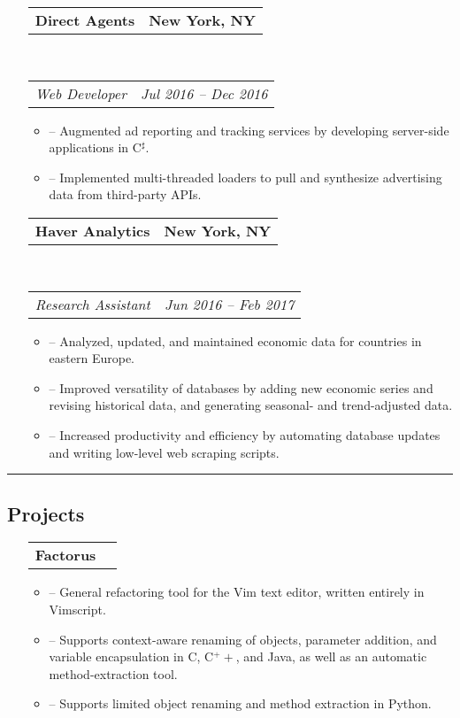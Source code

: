 \documentclass[10.5pt,letterpaper]{article}
\makeatletter
\newenvironment{shortlist}
{\setlength{\linewidth}{0.9\linewidth}
\begin{itemize}
}
{\end{itemize}}
\newcommand{\headerrow}[2]
{\begin{tabular*}{\linewidth}{l@{\extracolsep{\fill}}r}
	#1 &
	#2 \\
\end{tabular*}}
\makeatother
\begin{document}
\begin{itemize}
    \item[]
	\headerrow
		{\textbf{Direct Agents}}
		{\textbf{New York, NY}}
	\\
	\headerrow
		{\emph{Web Developer}}
		{\emph{Jul 2016 -- Dec 2016}}
	\begin{shortlist}
        \item[--]
        Augmented ad reporting and tracking services by developing server-side
        applications in C$^\sharp$.

        \item[--]
        Implemented multi-threaded loaders to pull and synthesize advertising data from third-party
        APIs.

	\end{shortlist}

    \item[]
	\headerrow
		{\textbf{Haver Analytics}}
		{\textbf{New York, NY}}
	\\
	\headerrow
		{\emph{Research Assistant}}
		{\emph{Jun 2016 -- Feb 2017}}
	\begin{shortlist}
        \item[--]
        Analyzed, updated, and maintained economic data for countries in eastern Europe.
        \item[--]
        Improved versatility of databases by adding new economic series and revising historical data, and
        generating seasonal- and trend-adjusted data.
        \item[--]
        Increased productivity and efficiency by automating database 
        updates and writing low-level web scraping scripts.
	\end{shortlist}

\end{itemize}

\hrule
\vspace{-0.4em}

\subsection*{Projects}

\begin{itemize}
    \parskip=0.1em

    \item[]
	\headerrow
		{\textbf{Factorus}}
		{}
	\begin{shortlist}
        \item[--]
        General refactoring tool for the Vim text editor, written entirely in Vimscript.
        \item[--]
        Supports context-aware renaming of objects, parameter addition, and variable encapsulation in C, C$^++$, and Java, as well as an automatic 
        method-extraction tool.
        \item[--]
        Supports limited object renaming and method extraction in Python.
    \end{shortlist}

\end{itemize}
\end{document}
